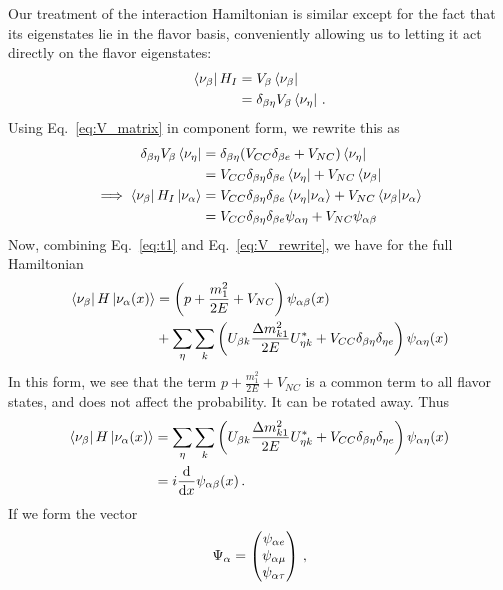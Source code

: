 Our treatment of the interaction Hamiltonian is similar except for the fact that its eigenstates lie in the flavor basis, conveniently allowing us
to letting it act directly on the flavor eigenstates:
\begin{align}
    \bra{\nu_\beta}H_I &= V_\beta \bra{\nu_\beta} \nonumber \\
                    &= \delta_{\beta\eta} V_\beta \bra{\nu_\eta}\,.
\end{align}
Using Eq.~\ref{eq:V_matrix} in component form, we rewrite this as
\begin{align}\label{eq:V_rewrite}
    \delta_{\beta\eta} V_\beta \bra{\nu_\eta} &= \delta_{\beta\eta} (V_{CC}\delta_{\beta e} + V_{NC}) \bra{\nu_\eta} \nonumber \\
                                           &= V_{CC}\delta_{\beta\eta}\delta_{\beta e} \bra{\nu_\eta} + V_{NC}\bra{\nu_\beta} \nonumber \\
    \implies \bra{\nu_\beta}H_I\ket{\nu_\alpha}   &= V_{CC}\delta_{\beta\eta}\delta_{\beta e} \bra{\nu_\eta}\ket{\nu_\alpha} + V_{NC}\bra{\nu_\beta}\ket{\nu_\alpha} \nonumber \\
                                           &= V_{CC}\delta_{\beta\eta}\delta_{\beta e} \psi_{\alpha\eta} + V_{NC}\psi_{\alpha\beta}
\end{align}
Now, combining Eq.~\ref{eq:t1} and Eq.~\ref{eq:V_rewrite}, we have for the full Hamiltonian
\begin{align}
    \bra{\nu_\b}H\ket{\nu_\a (x)} &= \left(p + \frac{m^2_1}{2E} + V_{NC}\right) \psi_{\a\b}(x) \nonumber \\
                                  &+ \sum_\eta\sum_k \left(U_{\b k} \frac{\dm_{k1}}{2E} U^*_{\eta k} + V_{CC}\delta_{\b\eta}\delta_{\eta e} \right) \psi_{\a\eta}(x)
\end{align}
In this form, we see that the term $p + \frac{m^2_1}{2E} + V_{NC}$  is a common term to all flavor states, and does not affect the probability. It can be rotated away.
Thus
\begin{align}\label{eq:components}
    \bra{\nu_\b}H\ket{\nu_\a (x)} &= \sum_\eta\sum_k \left(U_{\b k} \frac{\dm_{k1}}{2E} U^*_{\eta k} + V_{CC}\delta_{\b\eta}\delta_{\eta e}\right) \psi_{\a\eta}(x) \nonumber \\
                                  &= i \dv{}{x}\psi_{\a\b}(x)\,.
\end{align}
If we form the vector 
\begin{align}
    \Psi_\alpha = \begin{pmatrix}
        \psi_{\alpha e} \\
        \psi_{\alpha \mu} \\
        \psi_{\alpha \tau}
    \end{pmatrix}\,,
\end{align}
